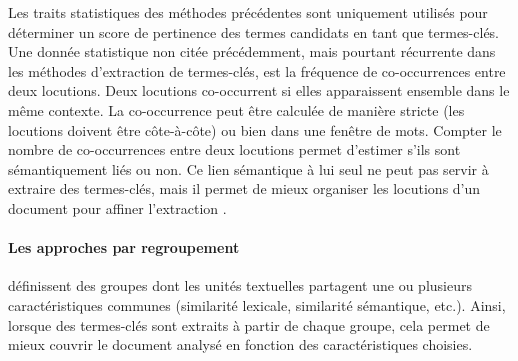           Les traits statistiques des méthodes précédentes sont uniquement utilisés
          pour déterminer un score de pertinence des termes candidats en tant que
          termes-clés. Une donnée statistique non citée précédemment, mais pourtant
          récurrente dans les méthodes d'extraction de termes-clés, est la fréquence
          de co-occurrences entre deux locutions. Deux locutions
          co-occurrent si elles apparaissent ensemble dans le même contexte. La
          co-occurrence peut être calculée de manière stricte (les locutions doivent
          être côte-à-côte) ou bien dans une fenêtre de mots. Compter le nombre de
          co-occurrences entre deux locutions permet d'estimer s'ils sont
          sémantiquement liés ou non. Ce lien sémantique à lui seul ne peut pas
          servir à extraire des termes-clés, mais il permet de mieux organiser les
          locutions d'un document pour affiner l'extraction
          \citep{matsuo2004wordcooccurrence, liu2009keycluster,
          mihalcea2004textrank}.

        \paragraph{Les approches par regroupement}
          définissent des groupes dont les unités textuelles partagent une ou
          plusieurs caractéristiques communes (similarité lexicale, similarité sémantique,
          etc.). Ainsi, lorsque des termes-clés sont extraits à partir de chaque
          groupe, cela permet de mieux couvrir le document analysé en fonction des
          caractéristiques choisies.

